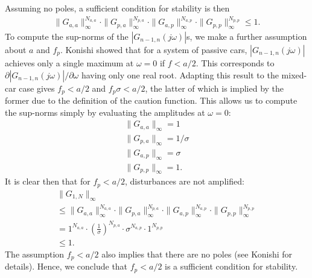 \documentclass[10pt,twocolumn]{article}
\begin{document}
Assuming no poles, a sufficient condition for stability is then
\begin{align*}
\|G_{a,a}\|_{\infty}^{N_{a,a}} \cdot \|G_{p,a}\|_{\infty}^{N_{p,a}} \cdot \|G_{a,p}\|_{\infty}^{N_{a,p}} \cdot \|G_{p,p}\|_{\infty}^{N_{p,p}} \leq 1.
\end{align*}
To compute the sup-norms of the $|G_{n-1,n}(j\omega)|$s, we make a further assumption about $a$ and $f_p$. Konishi \cite{Konishi} showed that for a system of passive cars, $|G_{n-1,n}(j\omega)|$ achieves only a single maximum at $\omega=0$ if $f < a/2$. This corresponds to $\partial |G_{n-1,n}(j\omega)|/\partial \omega$ having only one real root. Adapting this result to the mixed-car case gives $f_p < a/2$ and $f_p\sigma < a/2$, the latter of which is implied by the former due to the definition of the caution function. This allows us to compute the sup-norms simply by evaluating the amplitudes at $\omega=0$:
\begin{gather}
\|G_{a,a}\|_{\infty} = 1\\
\|G_{p,a}\|_{\infty} = 1/\sigma\\
\|G_{a,p}\|_{\infty} = \sigma\\
\|G_{p,p}\|_{\infty} = 1.
\end{gather}
It is clear then that for $f_p < a/2$, disturbances are not amplified:
\begin{align*}
&\|G_{1,N}\|_{\infty}&\\
&\leq \|G_{a,a}\|_{\infty}^{N_{a,a}} \cdot \|G_{p,a}\|_{\infty}^{N_{p,a}} \cdot \|G_{a,p}\|_{\infty}^{N_{a,p}} \cdot \|G_{p,p}\|_{\infty}^{N_{p,p}}& \\
&= 1^{N_{a,a}} \cdot \left(\frac{1}{\sigma}\right)^{N_{p,a}} \cdot \sigma^{N_{a,p}} \cdot 1^{N_{p,p}}& \\
&\leq 1.&
\end{align*}
The assumption $f_p < a/2$ also implies that there are no poles (see Konishi \cite{Konishi} for details). Hence, we conclude that $f_p < a/2$ is a sufficient condition for stability.
\end{document}
